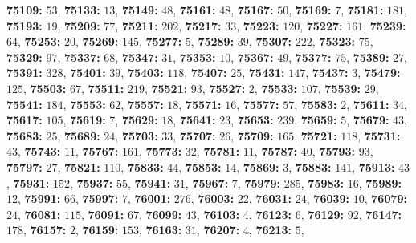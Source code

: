 \textsf{\bfseries 75109:} $53$, \textsf{\bfseries 75133:} $13$, \textsf{\bfseries 75149:} $48$, \textsf{\bfseries 75161:} $48$, \textsf{\bfseries 75167:} $50$, \textsf{\bfseries 75169:} $7$, \textsf{\bfseries 75181:} $181$, \textsf{\bfseries 75193:} $19$, \textsf{\bfseries 75209:} $77$, \textsf{\bfseries 75211:} $202$, \textsf{\bfseries 75217:} $33$, \textsf{\bfseries 75223:} $120$, \textsf{\bfseries 75227:} $161$, \textsf{\bfseries 75239:} $64$, \textsf{\bfseries 75253:} $20$, \textsf{\bfseries 75269:} $145$, \textsf{\bfseries 75277:} $5$, \textsf{\bfseries 75289:} $39$, \textsf{\bfseries 75307:} $222$, \textsf{\bfseries 75323:} $75$, \textsf{\bfseries 75329:} $97$, \textsf{\bfseries 75337:} $68$, \textsf{\bfseries 75347:} $31$, \textsf{\bfseries 75353:} $10$, \textsf{\bfseries 75367:} $49$, \textsf{\bfseries 75377:} $75$, \textsf{\bfseries 75389:} $27$, \textsf{\bfseries 75391:} $328$, \textsf{\bfseries 75401:} $39$, \textsf{\bfseries 75403:} $118$, \textsf{\bfseries 75407:} $25$, \textsf{\bfseries 75431:} $147$, \textsf{\bfseries 75437:} $3$, \textsf{\bfseries 75479:} $125$, \textsf{\bfseries 75503:} $67$, \textsf{\bfseries 75511:} $219$, \textsf{\bfseries 75521:} $93$, \textsf{\bfseries 75527:} $2$, \textsf{\bfseries 75533:} $107$, \textsf{\bfseries 75539:} $29$, \textsf{\bfseries 75541:} $184$, \textsf{\bfseries 75553:} $62$, \textsf{\bfseries 75557:} $18$, \textsf{\bfseries 75571:} $16$, \textsf{\bfseries 75577:} $57$, \textsf{\bfseries 75583:} $2$, \textsf{\bfseries 75611:} $34$, \textsf{\bfseries 75617:} $105$, \textsf{\bfseries 75619:} $7$, \textsf{\bfseries 75629:} $18$, \textsf{\bfseries 75641:} $23$, \textsf{\bfseries 75653:} $239$, \textsf{\bfseries 75659:} $5$, \textsf{\bfseries 75679:} $43$, \textsf{\bfseries 75683:} $25$, \textsf{\bfseries 75689:} $24$, \textsf{\bfseries 75703:} $33$, \textsf{\bfseries 75707:} $26$, \textsf{\bfseries 75709:} $165$, \textsf{\bfseries 75721:} $118$, \textsf{\bfseries 75731:} $43$, \textsf{\bfseries 75743:} $11$, \textsf{\bfseries 75767:} $161$, \textsf{\bfseries 75773:} $32$, \textsf{\bfseries 75781:} $11$, \textsf{\bfseries 75787:} $40$, \textsf{\bfseries 75793:} $93$, \textsf{\bfseries 75797:} $27$, \textsf{\bfseries 75821:} $110$, \textsf{\bfseries 75833:} $44$, \textsf{\bfseries 75853:} $14$, \textsf{\bfseries 75869:} $3$, \textsf{\bfseries 75883:} $141$, \textsf{\bfseries 75913:} $43$, \textsf{\bfseries 75931:} $152$, \textsf{\bfseries 75937:} $55$, \textsf{\bfseries 75941:} $31$, \textsf{\bfseries 75967:} $7$, \textsf{\bfseries 75979:} $285$, \textsf{\bfseries 75983:} $16$, \textsf{\bfseries 75989:} $12$, \textsf{\bfseries 75991:} $66$, \textsf{\bfseries 75997:} $7$, \textsf{\bfseries 76001:} $276$, \textsf{\bfseries 76003:} $22$, \textsf{\bfseries 76031:} $24$, \textsf{\bfseries 76039:} $10$, \textsf{\bfseries 76079:} $24$, \textsf{\bfseries 76081:} $115$, \textsf{\bfseries 76091:} $67$, \textsf{\bfseries 76099:} $43$, \textsf{\bfseries 76103:} $4$, \textsf{\bfseries 76123:} $6$, \textsf{\bfseries 76129:} $92$, \textsf{\bfseries 76147:} $178$, \textsf{\bfseries 76157:} $2$, \textsf{\bfseries 76159:} $153$, \textsf{\bfseries 76163:} $31$, \textsf{\bfseries 76207:} $4$, \textsf{\bfseries 76213:} $5$, 

